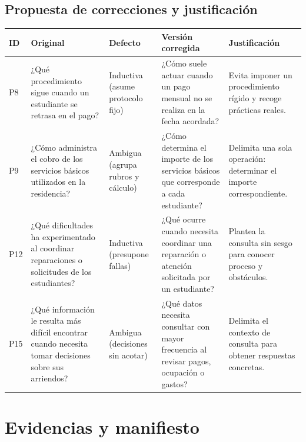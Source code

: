 \documentclass[12pt,a4paper]{article}
\renewcommand{\arraystretch}{1.12}
\begin{document}
\subsection{Propuesta de correcciones y justificación}
{\footnotesize
\renewcommand{\arraystretch}{1.1}
\begin{tabularx}{\linewidth}{|p{0.9cm}|p{2.7cm}|p{2.2cm}|p{3.0cm}|X|}
\hline
\textbf{ID} & \textbf{Original} & \textbf{Defecto} & \textbf{Versión corregida} & \textbf{Justificación} \\ \hline
P8 & ¿Qué procedimiento sigue cuando un estudiante se retrasa en el pago? & Inductiva (asume protocolo fijo) & ¿Cómo suele actuar cuando un pago mensual no se realiza en la fecha acordada? & Evita imponer un procedimiento rígido y recoge prácticas reales. \\ \hline
P9 & ¿Cómo administra el cobro de los servicios básicos utilizados en la residencia? & Ambigua (agrupa rubros y cálculo) & ¿Cómo determina el importe de los servicios básicos que corresponde a cada estudiante? & Delimita una sola operación: determinar el importe correspondiente. \\ \hline
P12 & ¿Qué dificultades ha experimentado al coordinar reparaciones o solicitudes de los estudiantes? & Inductiva (presupone fallas) & ¿Qué ocurre cuando necesita coordinar una reparación o atención solicitada por un estudiante? & Plantea la consulta sin sesgo para conocer proceso y obstáculos. \\ \hline
P15 & ¿Qué información le resulta más difícil encontrar cuando necesita tomar decisiones sobre sus arriendos? & Ambigua (decisiones sin acotar) & ¿Qué datos necesita consultar con mayor frecuencia al revisar pagos, ocupación o gastos? & Delimita el contexto de consulta para obtener respuestas concretas. \\ \hline
\end{tabularx}
}

\section{Evidencias y manifiesto}
\end{document}
